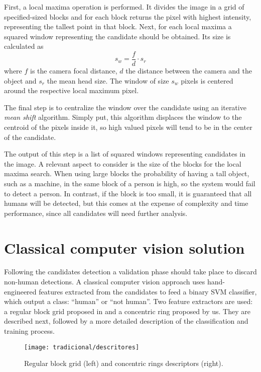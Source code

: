     First, a local maxima operation is performed. It divides the image in a grid of specified-sized blocks and for each block returns the pixel with highest intensity, representing the tallest point in that block. Next, for each local maxima a squared window representing the candidate should be obtained. Its size is calculated as
    \begin{equation}
      s_w = \frac{f}{d} \cdot s_r
    \end{equation}
    where $f$ is the camera focal distance, $d$ the distance between the camera and the object and $s_r$ the mean head size. The window of size $s_w$ pixels is centered around the respective local maximum pixel.

    The final step is to centralize the window over the candidate using an iterative \textit{mean shift} algorithm. Simply put, this algorithm displaces the window to the centroid of the pixels inside it, so high valued pixels will tend to be in the center of the candidate.

    The output of this step is a list of squared windows representing candidates in the image. A relevant aspect to consider is the size of the blocks for the local maxima search. When using large blocks the probability of having a tall object, such as a machine, in the same block of a person is high, so the system would fail to detect a person. In contrast, if the block is too small, it is guaranteed that all humans will be detected, but this comes at the expense of complexity and time performance, since all candidates will need further analysis.

\section{Classical computer vision solution}
\label{sec:classical}

    Following the candidates detection a validation phase should take place to discard non-human detections. A classical computer vision approach \cite{rauter} uses hand-engineered features extracted from the candidates to feed a binary SVM classifier, which output a class: ``human'' or ``not human''. Two feature extractors are used: a regular block grid proposed in \cite{rauter} and a concentric ring proposed by us. They are described next, followed by a more detailed description of the classification and training process.

    \begin{figure}
    \centering
    \texttt{[image: tradicional/descritores]}
    \caption{Regular block grid (left) and concentric rings descriptors (right).}
    \label{fig:descriptors}
    \end{figure}

